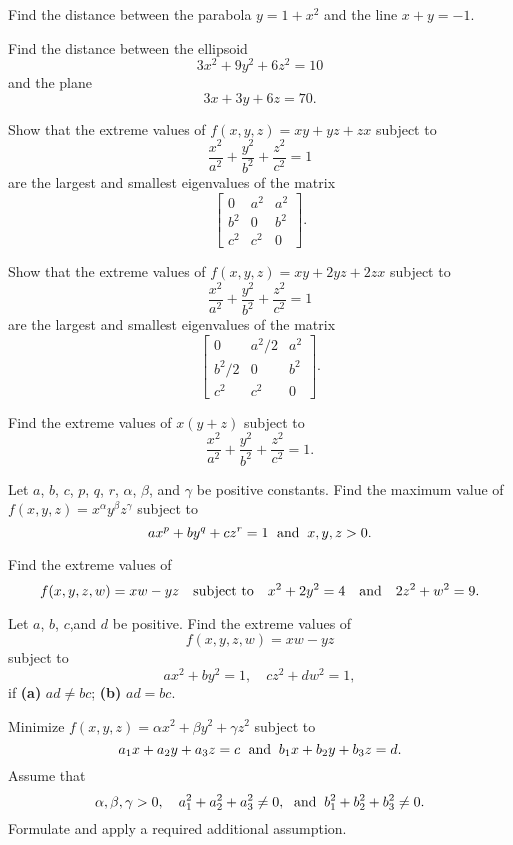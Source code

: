 \documentclass{article}
\newcounter{exercise}
\newenvironment{exerciselist}{\begin{list}{\bf \arabic{exercise}.}
{\topsep 10pt\partopsep 0pt\labelwidth 16pt
\labelsep 12pt\leftmargin 28pt
\itemsep 8pt\usecounter{exercise}}}{\end{list}}
\begin{document}
\begin{exerciselist}
\item\label{exer:37}
Find the distance between the parabola $y=1+x^{2}$ and the
line $x+y=-1$.

\item\label{exer:38}
Find the distance between the ellipsoid
$$
3x^{2}+9y^{2}+6z^{2}=10
$$
and the plane
$$
3x+3y+6z=70.
$$

\item\label{exer:39}
Show that the extreme values of $f(x,y,z)=xy+yz+zx$  subject to
$$
\frac{x^{2}}{a^{2}}+\frac{y^{2}}{b^{2}}+\frac{z^{2}}{c^{2}}=1
$$
are  the largest and smallest eigenvalues of the matrix
$$
\left[\begin{array}{ccccccc}
0&a^{2}&a^{2}\\ b^{2}&0&b^{2}\\c^{2}&c^{2}&0
\end{array}\right].
$$

\item\label{exer:40}
Show that the extreme values of $f(x,y,z)=xy+2yz+2zx$  subject to
$$
\frac{x^{2}}{a^{2}}+\frac{y^{2}}{b^{2}}+\frac{z^{2}}{c^{2}}=1
$$
are the largest and smallest eigenvalues of the matrix
$$
\left[\begin{array}{ccccccc}
0&a^{2}/2&a^{2}\\
b^{2}/2&0&b^{2}\\c^{2}&c^{2}&0
\end{array}\right].
$$
\item\label{exer:41}
Find the extreme values of  $x(y+z)$   subject to
$$
\frac{x^{2}}{a^{2}}+\frac{y^{2}}{b^{2}}+\frac{z^{2}}{c^{2}}=1.
$$

\item\label{exer:42}
Let $a$, $b$, $c$,  $p$, $q$, $r$, $\alpha$, $\beta$, and
$\gamma$ be positive constants.
Find the maximum value of $f(x,y,z)=x^{\alpha}y^{\beta}z^{\gamma}$  subject
to
$$
ax^{p}+by^{q}+cz^{r}=1 \text{\; and\;\;} x,y,z>0 .
$$

\item\label{exer:43}
 Find the extreme values  of
$$
f(x,y,z,w)=xw-yz \text{\quad subject to\quad}
x^{2}+2y^{2}=4\text{\quad and\quad} 2z^{2}+w^{2}=9.
$$

\item\label{exer:44}
Let $a$, $b$, $c$,and $d$ be positive. Find  the extreme values   of
$$
f(x,y,z,w)=xw-yz
$$
subject to
$$
ax^{2}+by^{2}=1, \quad cz^{2}+dw^{2}=1,
$$
if {\bf(a)}  $ad\ne bc$; {\bf(b)} $ad=bc.$

\item\label{exer:45}
Minimize $f(x,y,z)=\alpha x^{2}+\beta y^{2}+\gamma z^{2}$  subject to
$$
a_{1}x+a_{2}y+a_{3}z=c\text{\; and\;\;} b_{1}x+b_{2}y+b_{3}z=d.
$$
Assume that
$$
\alpha,\beta,\gamma>0,\quad a_{1}^{2}+a_{2}^{2}+a_{3}^{2}\ne0,
\text{\; and\;\;}
b_{1}^{2}+b_{2}^{2}+b_{3}^{2}\ne 0.
$$
Formulate and apply a required additional assumption.


\end{exerciselist}
\end{document}
